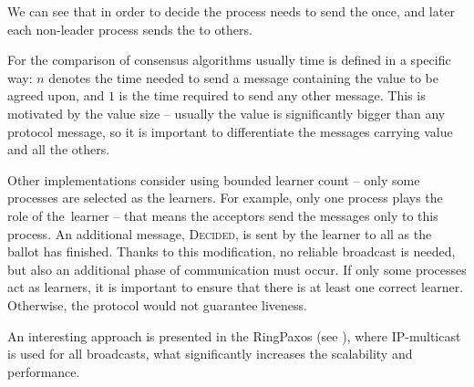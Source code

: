 We can see that in order to decide the process needs to send the \propose[] once, and later each non-leader process sends the \accept to others.

For the comparison of consensus algorithms usually time is defined in a specific way: $n$ denotes the time needed to send a message containing the value to be agreed upon, and $1$ is the time required to send any other message. This is motivated by the value size -- usually the value is significantly bigger than any protocol message, so it is important to differentiate the messages carrying value and all the others.

Other implementations consider using bounded learner count -- only some processes are selected as the learners. For example, only one process plays the role of the~learner -- that means the acceptors send the \accept messages only to this process. An additional message, \textsc{Decided}, is sent by the learner to all as the ballot has finished. Thanks to this modification, no reliable broadcast is needed, but also an additional phase of communication must occur. If only some processes act as learners, it is important to ensure that there is at least one correct learner. Otherwise, the protocol would not guarantee liveness.

An interesting approach is presented in the RingPaxos (see \cite{Mar10}), where IP-multicast is used for all broadcasts, what significantly increases the scalability and performance.
